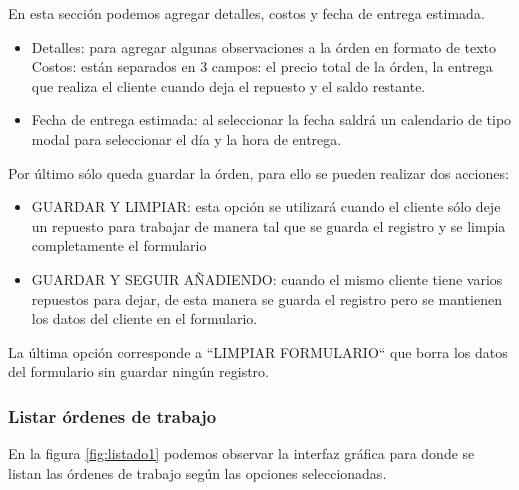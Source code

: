En esta sección podemos agregar detalles, costos y fecha de entrega estimada.

\begin{itemize}
\item Detalles: para agregar algunas observaciones a la órden en formato de texto
Costos: están separados en 3 campos: el precio total de la órden, la entrega que realiza el cliente cuando deja el repuesto y el saldo restante. 
\item Fecha de entrega estimada: al seleccionar la fecha saldrá un calendario de tipo modal para seleccionar el día y la hora de entrega. 
\end{itemize}


Por último sólo queda guardar la órden, para ello se pueden realizar dos acciones: 

\begin{itemize}
\item GUARDAR Y LIMPIAR: esta opción se utilizará cuando el cliente sólo deje un repuesto para trabajar de manera tal que se guarda el registro y se limpia completamente el formulario

\item GUARDAR Y SEGUIR AÑADIENDO: cuando el mismo cliente tiene varios repuestos para dejar, de esta manera se guarda el registro pero se mantienen los datos del cliente en el formulario. 
\end{itemize}

La última opción corresponde a ``LIMPIAR FORMULARIO`` que borra los datos del formulario sin guardar ningún registro.


\subsubsection{Listar órdenes de trabajo}
\label{subsubsec:frontlistarordenes}

En la figura \ref{fig:listado1} podemos observar la interfaz gráfica para donde se listan las órdenes de trabajo según las opciones seleccionadas.

